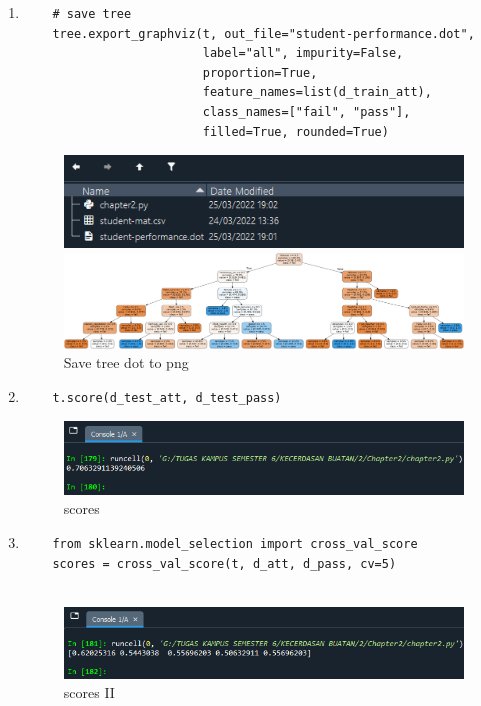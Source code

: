 \begin{enumerate}
	\item
	      \begin{verbatim}
	# save tree
	tree.export_graphviz(t, out_file="student-performance.dot", 
						 label="all", impurity=False, 
						 proportion=True,
	                     feature_names=list(d_train_att), 
	                     class_names=["fail", "pass"], 
	                     filled=True, rounded=True)
\end{verbatim}
	      \begin{figure}[ht]
		      \centerline{\includegraphics[scale=0.7]{figures/Chapter2h.png}}
		      \centerline{\includegraphics[scale=0.1]{figures/student-performance.png}}
		      \caption{Save tree dot to png}
		      \label{Save tree dot to png}
	      \end{figure}

	\item
	      \begin{verbatim}
	t.score(d_test_att, d_test_pass)
\end{verbatim}
	      \begin{figure}[ht]
		      \centerline{\includegraphics[scale=0.7]{figures/Chapter2i.png}}
		      \caption{scores}
		      \label{scores}
	      \end{figure}

	\item
	      \begin{verbatim}
	from sklearn.model_selection import cross_val_score
	scores = cross_val_score(t, d_att, d_pass, cv=5)
	
\end{verbatim}
	      \begin{figure}[ht]
		      \centerline{\includegraphics[scale=0.7]{figures/Chapter2j.png}}
		      \caption{scores II}
		      \label{scores II}
	      \end{figure}


\end{enumerate}
